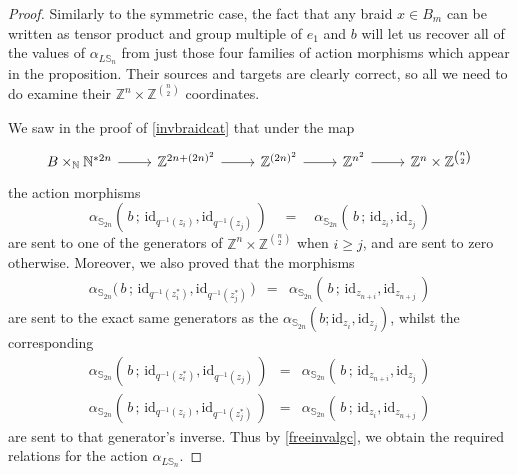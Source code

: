 \documentclass{amsbook} %
\numberwithin{section}{chapter}
\begin{document}
\begin{proof}
Similarly to the symmetric case, the fact that any braid $x \in B_m$ can be written as tensor product and group multiple of $e_1$ and $b$ will let us recover all of the values of $\alpha_{L\mathbb{S}_n}$ from just those four families of action morphisms which appear in the proposition. Their sources and targets are clearly correct, so all we need to do examine their $\mathbb{Z}^{n} \times \mathbb{Z}^{{n}\choose{2}}$ coordinates.

We saw in the proof of \cref{invbraidcat} that under the map
\[ \begin{tikzcd}
B \times_{\mathbb{N}} \mathbb{N}^{\ast 2n} \ar[r] & \mathbb{Z}^{2n + (2n)^2} \ar[r] & \mathbb{Z}^{(2n)^2} \ar[r] & \mathbb{Z}^{n^2} \ar[r] & \mathbb{Z}^{n} \times \mathbb{Z}^{{n}\choose{2}} 
\end{tikzcd} \]
the action morphisms
\[ \alpha_{\mathbb{S}_{2n}}( \, b \, ; \, \mathrm{id}_{q^{-1}(z_i)}, \mathrm{id}_{q^{-1}(z_j)} \, ) \quad = \quad \alpha_{\mathbb{S}_{2n}}( \, b \, ; \, \mathrm{id}_{z_i}, \mathrm{id}_{z_j} \, ) \]
are sent to one of the generators of $\mathbb{Z}^{n} \times \mathbb{Z}^{{n}\choose{2}}$ when $i \ge j$, and are sent to zero otherwise. Moreover, we also proved that the morphisms
\[ \begin{array}{rll} 
			\alpha_{\mathbb{S}_{2n}}( \, b \, ; \, \mathrm{id}_{q^{-1}(z_i^*)}, \mathrm{id}_{q^{-1}(z_j^*)} \, \big) & = & \alpha_{\mathbb{S}_{2n}}( \, b \, ; \, \mathrm{id}_{z_{n+i}}, \mathrm{id}_{z_{n+j}} \, )
		\end{array}
\]
are sent to the exact same generators as the $\alpha_{\mathbb{S}_{2n}}(b;\mathrm{id}_{z_i}, \mathrm{id}_{z_j})$, whilst the corresponding
\[ \begin{array}{rll}
			\alpha_{\mathbb{S}_{2n}}( \, b\, ; \, \mathrm{id}_{q^{-1}(z_i^*)}, \mathrm{id}_{q^{-1}(z_j)} \, ) & = & \alpha_{\mathbb{S}_{2n}}( \, b \, ; \, \mathrm{id}_{z_{n+i}}, \mathrm{id}_{z_j} \, ) \\
			\alpha_{\mathbb{S}_{2n}}( \, b \, ; \, \mathrm{id}_{q^{-1}(z_i)}, \mathrm{id}_{q^{-1}(z_j^*)} \, ) & = & \alpha_{\mathbb{S}_{2n}}( \, b \, ; \, \mathrm{id}_{z_i}, \mathrm{id}_{z_{n+j}} \, ) 
		\end{array}
\]
are sent to that generator's inverse. Thus by \cref{freeinvalgc}, we obtain the required relations for the action $\alpha_{L\mathbb{S}_n}$.
\end{proof}
\end{document}
